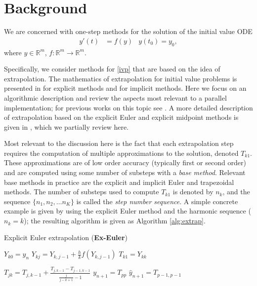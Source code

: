 \documentclass[12pt]{article}
\newcommand{\Real}{\mathbb{R}}
\begin{document}
\section{Background}
We are concerned with one-step methods for the solution of the initial value ODE
\begin{align} \label{ivp}
y'(t) & = f(y) & y(t_0) = y_0,
\end{align}
where $y\in\Real^m$, $f: \Real^m \to \Real^m$.

Specifically, we consider methods for \eqref{ivp} that
are based on the idea of extrapolation.
The mathematics of extrapolation for initial value problems 
is presented in
\cite[Section~II.9]{hairer1993} for explicit methods and
\cite[Section~IV.9]{Hairer:ODEs2} for implicit methods.
Here we focus on an algorithmic description and review the
aspects most relevant to a parallel implementation; for previous
works on this topic see \cite{VanderHouwen1990,Rauber1997,Korch2011}.
A more detailed description of extrapolation based on the explicit
Euler and explicit midpoint methods is given in \cite[Section~2.1]{2014_hork},
which we partially review here.

Most relevant to the discussion here is the fact that each
extrapolation step requires the computation of multiple approximations
to the solution, denoted $T_{k1}$.  These approximations are of
low order accuracy (typically first or second order) and are computed
using some number of substeps with a {\em base method}.  Relevant
base methods in practice are the explicit and implicit Euler and
trapezoidal methods.
The number of substeps used to compute $T_{k1}$ is denoted by $n_k$,
and the sequence $\{n_1, n_2, \dots n_K\}$ is called the {\em
step number sequence}.  A simple concrete example is given by using
the explicit Euler method and the harmonic sequence ($n_k = k$);
the resulting algorithm is given as Algorithm \ref{alg:extrap}.

\begin{algorithm}\caption{Explicit Euler extrapolation ({\bf Ex-Euler})}
\label{alg:extrap}
\begin{algorithmic}

  
    \State $Y_{k0} = y_n$
        \State $Y_{kj} = Y_{k,j-1} + \frac{h}{k}f(Y_{k,j-1})$
    \EndFor
    \State $T_{k1} = Y_{kk}$
\EndFor

  
        \State $T_{jk} = T_{j,k-1} + \frac{T_{j,k-1}-T_{j-1,k-1}}{\frac{j}{j-k+1}-1}$
    \EndFor
\EndFor
\State $y_{n+1} = T_{pp}$ 
\State $\hat{y}_{n+1} = T_{p-1,p-1}$ 
\end{algorithmic}
\end{algorithm}
\end{document}
